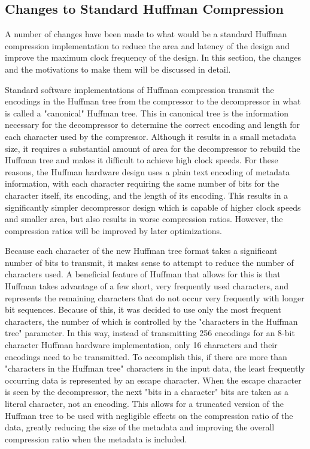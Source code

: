 \documentclass[doublespace,draft,nopageskip]{VTthesis} %
\begin{document}
\subsection{Changes to Standard Huffman Compression}\label{ss:changes_to_standard_huffman_compression}
A number of changes have been made to what would be a standard Huffman compression implementation to reduce the area and latency of the design and improve the maximum clock frequency of the design. In this section, the changes and the motivations to make them will be discussed in detail.

Standard software implementations of Huffman compression transmit the encodings in the Huffman tree from the compressor to the decompressor in what is called a "canonical" Huffman tree. This in canonical tree is the information necessary for the decompressor to determine the correct encoding and length for each character used by the compressor. Although it results in a small metadata size, it requires a substantial amount of area for the decompressor to rebuild the Huffman tree and makes it difficult to achieve high clock speeds. For these reasons, the Huffman hardware design uses a plain text encoding of metadata information, with each character requiring the same number of bits for the character itself, its encoding, and the length of its encoding. This results in a significantly simpler decompressor design which is capable of higher clock speeds and smaller area, but also results in worse compression ratios. However, the compression ratios will be improved by later optimizations.

Because each character of the new Huffman tree format takes a significant number of bits to transmit, it makes sense to attempt to reduce the number of characters used. A beneficial feature of Huffman that allows for this is that Huffman takes advantage of a few short, very frequently used characters, and represents the remaining characters that do not occur very frequently with longer bit sequences. Because of this, it was decided to use only the most frequent characters, the number of which is controlled by the "characters in the Huffman tree" parameter. In this way, instead of transmitting 256 encodings for an 8-bit character Huffman hardware implementation, only 16 characters and their encodings need to be transmitted. To accomplish this, if there are more than "characters in the Huffman tree" characters in the input data, the least frequently occurring data is represented by an escape character. When the escape character is seen by the decompressor, the next "bits in a character" bits are taken as a literal character, not an encoding. This allows for a truncated version of the Huffman tree to be used with negligible effects on the compression ratio of the data, greatly reducing the size of the metadata and improving the overall compression ratio when the metadata is included.
\end{document}
